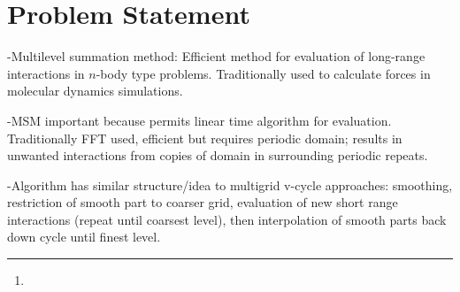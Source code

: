 \documentclass[review]{siamart}
\author{\TheName\thanks{\TheAddress}}
\title{{\TheTitle}}
\begin{document}
\maketitle

\vspace{1cm}

%

\section{Problem Statement}\label{sec:problem}
-Multilevel summation method\cite{2}: Efficient method for evaluation of long-range interactions in $n$-body type problems. Traditionally used to calculate forces in molecular dynamics simulations.

-MSM important because permits linear time algorithm for evaluation. Traditionally FFT used, efficient but requires periodic domain; results in unwanted interactions from copies of domain in surrounding periodic repeats.

-Algorithm has similar structure/idea to multigrid v-cycle approaches: smoothing, restriction of smooth part to coarser grid, evaluation of new short range interactions (repeat until coarsest level), then interpolation of smooth parts back down cycle until finest level\cite{1}.
\end{document}
